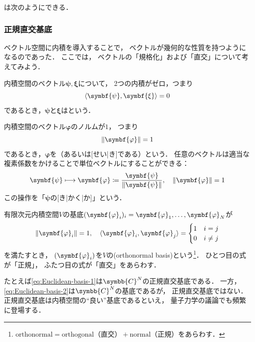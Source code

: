 \documentclass[
]{sotsu}
\newcommand{\bpsi}{\symbf{\psi}}
\newcommand{\bphi}{\symbf{\varphi}}
\newcommand{\bxi}{\symbf{\xi}}
\begin{document}
は次のようにできる．




\subsubsection{正規直交基底}
\label{sec:CONS}

ベクトル空間に内積を導入することで，
ベクトルが幾何的な性質を持つようになるのであった．
ここでは，
ベクトルの「規格化」および「直交」について考えてみよう．

内積空間のベクトル$\bpsi, \bxi$について，
2つの内積がゼロ，つまり
\begin{equation*}
    \label{eq:orthogonal}
    \iparen{\bpsi, \bxi} = 0
\end{equation*}
であるとき，$\bpsi$と$\bxi$はという．

内積空間のベクトル$\bphi$のノルムが$1$，
つまり
\begin{equation}
    \label{eq:normalization}
    \norm{\bphi} = 1
\end{equation}
であるとき，$\bphi$を（あるいは[せい|き]である）という．
任意のベクトルは適当な複素係数をかけることで単位ベクトルにすることができる：
\begin{equation*}
    \bpsi \longmapsto \bphi \coloneq \frac{\bpsi}{\norm{\bpsi}},
    \quad
    \norm{\bphi} = 1
\end{equation*}
この操作を「$\bpsi$の[き|かく|か]」という．

有限次元内積空間$V$の基底$\sequ{\bphi_i}[i] = \bphi_1, \dots, \bphi_N$が
\begin{equation}
    \label{eq:orthonormal}
    \norm{\bphi_i} = 1, 
    \quad
    \iparen{\bphi_i, \bphi_j} = 
    \begin{cases}
        1  &  i = j  \\
        0  &  i \neq j
    \end{cases}
\end{equation}
を満たすとき，
$\sequ{\bphi_i}$を$V$の(orthonormal basis)という\footnote{
    $\text{orthonormal} = \text{orthogonal（直交）} + \text{normal（正規）}$をあらわす．
}．
ひとつ目の式が「正規」，
ふたつ目の式が「直交」をあらわす．

たとえば\cref{eq:Euclidean-basis-1}は$\symbb{C}^N$の正規直交基底である．
一方，\cref{eq:Euclidean-basis-2}は$\symbb{C}^N$の基底であるが，
正規直交基底ではない．
正規直交基底は内積空間の``良い''基底であるといえ，
量子力学の議論でも頻繁に登場する．
\end{document}
